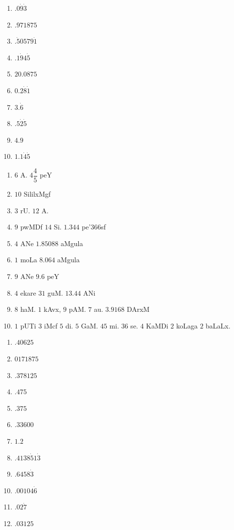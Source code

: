 \smallskip
{}

\begin{multicols}{5}
\begin{enumerate}[$(1)$]
\item $.0\dot{9}\dot{3}$
\item $.971875$
\item $.\dot{5}0579\dot{1}$
\item $.1\dot{9}4\dot{5}$
\item $20.0875$
\item $0.2\dot{8}\dot{1}$
\item $3.\dot{6}$
\item $.5\dot{2}\dot{5}$
\item $4.9$
\item $1.1\dot{4}\dot{5}$
\end{enumerate}
\end{multicols}

\smallskip
{}

\begin{multicols}{2}
\begin{enumerate}[$(1)$]
\item $6$ A. $4\dfrac{4}{5}$ peY
\item $10$ SililxMgf
\item $3$ rU. $12$ A.
\item $9$ pwMDf $14$ Si. $1.344$ pe\char'366sf
\item $4$ ANe $1.85088$ aMgula
\item $1$ moLa $8.064$ aMgula
\item $9$ ANe $9.6$ peY
\item $4$ ekare $31$ guM. $13.44$ ANi
\item $8$ haM. $1$ kAvx, $9$ pAM. $7$ au. $3.9168$ DArxM
\item $1$ pUTi $3$ iMcf $5$ di. $5$ GaM. $45$ mi. $36$ se. $4$ KaMDi
$2$ koLaga $2$ baLaLx.
\end{enumerate}
\end{multicols}

\smallskip
{}

\begin{multicols}{4}
\begin{enumerate}[$(1)$]
\item $.40625$
\item $0171875$
\item $.378125$
\item $.475$
\item $.375$
\item $.33600$
\item $1.2$
\item $.4138\dot{5}1\dot{3}$
\item $.6458\dot{3}$
\item $.00104\dot{6}$
\item $.02\dot{7}$
\item $.03125$
\end{enumerate}
\end{multicols}


